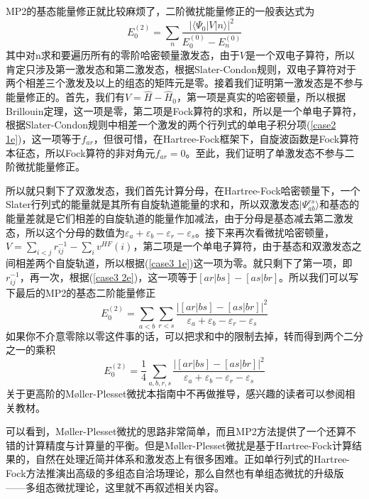 \documentclass[12pt,a4paper,openany,twoside]{book}
\numberwithin{equation}{section}
\begin{document}
          MP2的基态能量修正就比较麻烦了，二阶微扰能量修正的一般表达式为
          \begin{equation}
            E_0^{(2)} = \sum_n\frac{\left| \langle \Psi_0 | V | n \rangle \right|^2}{E_0^{(0)}-E_n^{(0)}}
          \end{equation}
          其中对n求和要遍历所有的零阶哈密顿量激发态，由于$V$是一个双电子算符，所以肯定只涉及第一激发态和第二激发态，根据Slater-Condon规则，双电子算符对于两个相差三个激发及以上的组态的矩阵元是零。接着我们证明第一激发态是不参与能量修正的。首先，我们有$V = \hat{H} - \hat{H}_0$，第一项是真实的哈密顿量，所以根据Brillouin定理，这一项是零，第二项是Fock算符的求和，所以是一个单电子算符，根据Slater-Condon规则中相差一个激发的两个行列式的单电子积分项(\ref{case2 1e})，这一项等于$f_{ar}$，但很可惜，在Hartree-Fock框架下，自旋波函数是Fock算符本征态，所以Fock算符的非对角元$f_{ar} = 0$。至此，我们证明了单激发态不参与二阶微扰能量修正。

          所以就只剩下了双激发态，我们首先计算分母，在Hartree-Fock哈密顿量下，一个Slater行列式的能量就是其所有自旋轨道能量的求和，所以双激发态$ | \Psi_{ab}^{rs} \rangle $和基态的能量差就是它们相差的自旋轨道的能量作加减法，由于分母是基态减去第二激发态，所以这个分母的数值为$\varepsilon_a + \varepsilon_b -\varepsilon_r - \varepsilon_s$。接下来再次看微扰哈密顿量，$V = \sum_{i <j} r_{ij}^{-1} -  \sum_i v^{HF}(i)$，第二项是一个单电子算符，由于基态和双激发态之间相差两个自旋轨道，所以根据(\ref{case3 1e})这一项为零。就只剩下了第一项，即$r_{ij}^{-1}$，再一次，根据(\ref{case3 2e})，这一项等于$[ar|bs]-[as|br]$。所以我们可以写下最后的MP2的基态二阶能量修正
          \begin{equation}
            E_0^{(2)} = \sum_{a<b}\sum_{r<s} \frac{\left|[ar|bs]-[as|br]\right|^2}{\varepsilon_a + \varepsilon_b -\varepsilon_r - \varepsilon_s}
          \end{equation}
          如果你不介意零除以零这件事的话，可以把求和中的限制去掉，转而得到两个二分之一的乘积
          \begin{equation}
            E_0^{(2)} = \frac{1}{4}\sum_{a,b,r,s} \frac{\left|[ar|bs]-[as|br]\right|^2}{\varepsilon_a + \varepsilon_b -\varepsilon_r - \varepsilon_s}
            \label{MP2 energy correction}
          \end{equation}
          关于更高阶的M\o ller-Plesset微扰本指南中不再做推导，感兴趣的读者可以参阅相关教材。

          可以看到，M\o ller-Plesset微扰的思路非常简单，而且MP2方法提供了一个还算不错的计算精度与计算量的平衡。但是M\o ller-Plesset微扰是基于Hartree-Fock计算结果的，自然在处理近简并体系和激发态上有很多困难。正如单行列式的Hartree-Fock方法推演出高级的多组态自洽场理论，那么自然也有单组态微扰的升级版——多组态微扰理论，这里就不再叙述相关内容。
\end{document}
